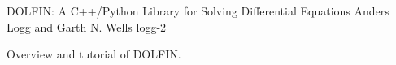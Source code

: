               {DOLFIN: A C++/Python Library for Solving Differential Equations}
              {Anders Logg and Garth N. Wells}
              {logg-2}

Overview and tutorial of DOLFIN.
